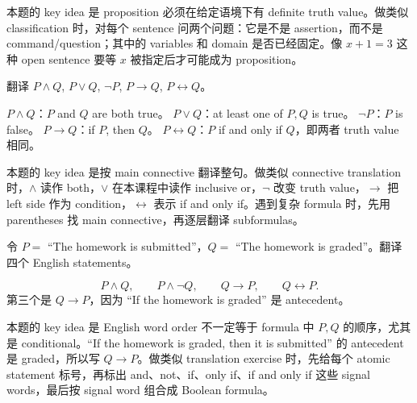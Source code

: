 \begin{explanation}
本题的 key idea 是 proposition 必须在给定语境下有 definite truth value。做类似 classification 时，对每个 sentence 问两个问题：它是不是 assertion，而不是 command/question；其中的 variables 和 domain 是否已经固定。像 \(x+1=3\) 这种 open sentence 要等 \(x\) 被指定后才可能成为 proposition。
\end{explanation}

\begin{exerciseblock}
翻译 \(P\land Q\), \(P\lor Q\), \(\lnot P\), \(P\to Q\), \(P\leftrightarrow Q\)。
\end{exerciseblock}

\begin{solution}
\(P\land Q\)：\(P\) and \(Q\) are both true。\quad
\(P\lor Q\)：at least one of \(P,Q\) is true。\quad
\(\lnot P\)：\(P\) is false。\quad
\(P\to Q\)：if \(P\), then \(Q\)。\quad
\(P\leftrightarrow Q\)：\(P\) if and only if \(Q\)，即两者 truth value 相同。
\end{solution}

\begin{explanation}
本题的 key idea 是按 main connective 翻译整句。做类似 connective translation 时，\(\land\) 读作 both，\(\lor\) 在本课程中读作 inclusive or，\(\lnot\) 改变 truth value，\(\to\) 把 left side 作为 condition，\(\leftrightarrow\) 表示 if and only if。遇到复杂 formula 时，先用 parentheses 找 main connective，再逐层翻译 subformulas。
\end{explanation}

\begin{exerciseblock}
令 \(P=\) ``The homework is submitted''，\(Q=\) ``The homework is graded''。翻译四个 English statements。
\end{exerciseblock}

\begin{solution}
\[
P\land Q,\qquad P\land\lnot Q,\qquad Q\to P,\qquad Q\leftrightarrow P.
\]
第三个是 \(Q\to P\)，因为 ``If the homework is graded'' 是 antecedent。
\end{solution}

\begin{explanation}
本题的 key idea 是 English word order 不一定等于 formula 中 \(P,Q\) 的顺序，尤其是 conditional。``If the homework is graded, then it is submitted'' 的 antecedent 是 graded，所以写 \(Q\to P\)。做类似 translation exercise 时，先给每个 atomic statement 标号，再标出 and、not、if、only if、if and only if 这些 signal words，最后按 signal word 组合成 Boolean formula。
\end{explanation}

